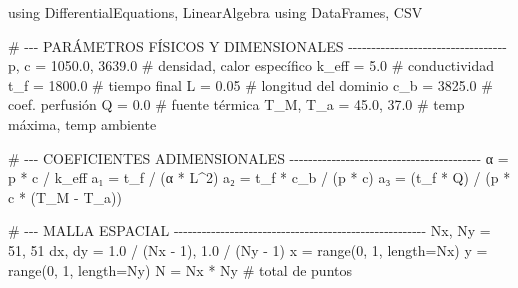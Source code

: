 \documentclass[
  spanish,
  us-letterpaper,
  DIV=11,
  numbers=noendperiod]{scrreprt}
\newenvironment{Shaded}{\begin{snugshade}}{\end{snugshade}}
\newcommand{\BuiltInTok}[1]{\textcolor[rgb]{0.00,0.23,0.31}{#1}}
\newcommand{\CommentTok}[1]{\textcolor[rgb]{0.37,0.37,0.37}{#1}}
\newcommand{\FloatTok}[1]{\textcolor[rgb]{0.68,0.00,0.00}{#1}}
\newcommand{\FunctionTok}[1]{\textcolor[rgb]{0.28,0.35,0.67}{#1}}
\newcommand{\ImportTok}[1]{\textcolor[rgb]{0.00,0.46,0.62}{#1}}
\newcommand{\NormalTok}[1]{\textcolor[rgb]{0.00,0.23,0.31}{#1}}
\newcommand{\OperatorTok}[1]{\textcolor[rgb]{0.37,0.37,0.37}{#1}}
\theoremstyle{plain}
\theoremstyle{definition}
\theoremstyle{remark}
\begin{document}
\begin{Shaded}
\begin{Highlighting}[]
\ImportTok{using} \BuiltInTok{DifferentialEquations}\NormalTok{, }\BuiltInTok{LinearAlgebra}
\ImportTok{using} \BuiltInTok{DataFrames}\NormalTok{, }\BuiltInTok{CSV}

\CommentTok{\# {-}{-}{-} PARÁMETROS FÍSICOS Y DIMENSIONALES {-}{-}{-}{-}{-}{-}{-}{-}{-}{-}{-}{-}{-}{-}{-}{-}{-}{-}{-}{-}{-}{-}{-}{-}{-}{-}{-}{-}{-}{-}{-}{-}{-}{-}}
\NormalTok{p, c  }\OperatorTok{=} \FloatTok{1050.0}\NormalTok{, }\FloatTok{3639.0}                       \CommentTok{\# densidad, calor específico }
\NormalTok{k\_eff }\OperatorTok{=} \FloatTok{5.0}                                  \CommentTok{\# conductividad}
\NormalTok{t\_f   }\OperatorTok{=} \FloatTok{1800.0}                               \CommentTok{\# tiempo final }
\NormalTok{L     }\OperatorTok{=} \FloatTok{0.05}                                 \CommentTok{\# longitud del dominio}
\NormalTok{c\_b   }\OperatorTok{=} \FloatTok{3825.0}                               \CommentTok{\# coef. perfusión}
\NormalTok{Q     }\OperatorTok{=} \FloatTok{0.0}                                  \CommentTok{\# fuente térmica}
\NormalTok{T\_M, T\_a }\OperatorTok{=} \FloatTok{45.0}\NormalTok{, }\FloatTok{37.0}                        \CommentTok{\# temp máxima, temp ambiente}

\CommentTok{\# {-}{-}{-} COEFICIENTES ADIMENSIONALES {-}{-}{-}{-}{-}{-}{-}{-}{-}{-}{-}{-}{-}{-}{-}{-}{-}{-}{-}{-}{-}{-}{-}{-}{-}{-}{-}{-}{-}{-}{-}{-}{-}{-}{-}{-}{-}{-}{-}{-}{-}}
\NormalTok{α }\OperatorTok{=}\NormalTok{ p }\OperatorTok{*}\NormalTok{ c }\OperatorTok{/}\NormalTok{ k\_eff}
\NormalTok{a₁ }\OperatorTok{=}\NormalTok{ t\_f }\OperatorTok{/}\NormalTok{ (α }\OperatorTok{*}\NormalTok{ L}\OperatorTok{\^{}}\FloatTok{2}\NormalTok{)}
\NormalTok{a₂ }\OperatorTok{=}\NormalTok{ t\_f }\OperatorTok{*}\NormalTok{ c\_b }\OperatorTok{/}\NormalTok{ (p }\OperatorTok{*}\NormalTok{ c)}
\NormalTok{a₃ }\OperatorTok{=}\NormalTok{ (t\_f }\OperatorTok{*}\NormalTok{ Q) }\OperatorTok{/}\NormalTok{ (p }\OperatorTok{*}\NormalTok{ c }\OperatorTok{*}\NormalTok{ (T\_M }\OperatorTok{{-}}\NormalTok{ T\_a))}

\CommentTok{\# {-}{-}{-} MALLA ESPACIAL {-}{-}{-}{-}{-}{-}{-}{-}{-}{-}{-}{-}{-}{-}{-}{-}{-}{-}{-}{-}{-}{-}{-}{-}{-}{-}{-}{-}{-}{-}{-}{-}{-}{-}{-}{-}{-}{-}{-}{-}{-}{-}{-}{-}{-}{-}{-}{-}{-}{-}{-}{-}{-}{-}}
\NormalTok{Nx, Ny }\OperatorTok{=} \FloatTok{51}\NormalTok{, }\FloatTok{51}
\NormalTok{dx, dy }\OperatorTok{=} \FloatTok{1.0} \OperatorTok{/}\NormalTok{ (Nx }\OperatorTok{{-}} \FloatTok{1}\NormalTok{), }\FloatTok{1.0} \OperatorTok{/}\NormalTok{ (Ny }\OperatorTok{{-}} \FloatTok{1}\NormalTok{)}
\NormalTok{x }\OperatorTok{=} \FunctionTok{range}\NormalTok{(}\FloatTok{0}\NormalTok{, }\FloatTok{1}\NormalTok{, length}\OperatorTok{=}\NormalTok{Nx)}
\NormalTok{y }\OperatorTok{=} \FunctionTok{range}\NormalTok{(}\FloatTok{0}\NormalTok{, }\FloatTok{1}\NormalTok{, length}\OperatorTok{=}\NormalTok{Ny)}
\NormalTok{N }\OperatorTok{=}\NormalTok{ Nx }\OperatorTok{*}\NormalTok{ Ny  }\CommentTok{\# total de puntos}


\end{Highlighting}
\end{Shaded}
\end{document}
